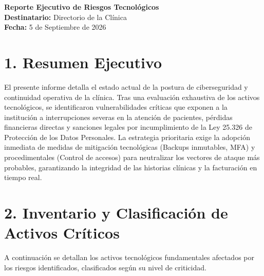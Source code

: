 \documentclass[11pt,a4paper]{article}
\begin{document}
\begin{center}
    {\Huge \textbf{\color{primary}Reporte Ejecutivo de Riesgos Tecnológicos}}\\[0.5cm]
    {\large \textbf{Destinatario:} Directorio de la Clínica}\\[0.2cm]
    {\large \textbf{Fecha:} 5 de Septiembre de 2026}\\[0.5cm]
\end{center}

\vspace{0.5cm}

\section*{1. Resumen Ejecutivo}
El presente informe detalla el estado actual de la postura de ciberseguridad y continuidad operativa de la clínica. Tras una evaluación exhaustiva de los activos tecnológicos, se identificaron vulnerabilidades críticas que exponen a la institución a interrupciones severas en la atención de pacientes, pérdidas financieras directas y sanciones legales por incumplimiento de la Ley 25.326 de Protección de los Datos Personales. La estrategia prioritaria exige la adopción inmediata de medidas de mitigación tecnológicas (Backups inmutables, MFA) y procedimentales (Control de accesos) para neutralizar los vectores de ataque más probables, garantizando la integridad de las historias clínicas y la facturación en tiempo real.

\vspace{0.5cm}

\section*{2. Inventario y Clasificación de Activos Críticos}
A continuación se detallan los activos tecnológicos fundamentales afectados por los riesgos identificados, clasificados según su nivel de criticidad.
\end{document}
